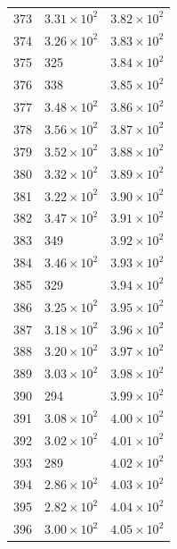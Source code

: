 \begin{table}[H]
\begin{tabular}{lll}
373 & $\displaystyle 3.31 \times 10^{2}$ & $\displaystyle 3.82 \times 10^{2}$ \\
374 & $\displaystyle 3.26 \times 10^{2}$ & $\displaystyle 3.83 \times 10^{2}$ \\
375 & 325 & $\displaystyle 3.84 \times 10^{2}$ \\
376 & 338 & $\displaystyle 3.85 \times 10^{2}$ \\
377 & $\displaystyle 3.48 \times 10^{2}$ & $\displaystyle 3.86 \times 10^{2}$ \\
378 & $\displaystyle 3.56 \times 10^{2}$ & $\displaystyle 3.87 \times 10^{2}$ \\
379 & $\displaystyle 3.52 \times 10^{2}$ & $\displaystyle 3.88 \times 10^{2}$ \\
380 & $\displaystyle 3.32 \times 10^{2}$ & $\displaystyle 3.89 \times 10^{2}$ \\
381 & $\displaystyle 3.22 \times 10^{2}$ & $\displaystyle 3.90 \times 10^{2}$ \\
382 & $\displaystyle 3.47 \times 10^{2}$ & $\displaystyle 3.91 \times 10^{2}$ \\
383 & 349 & $\displaystyle 3.92 \times 10^{2}$ \\
384 & $\displaystyle 3.46 \times 10^{2}$ & $\displaystyle 3.93 \times 10^{2}$ \\
385 & 329 & $\displaystyle 3.94 \times 10^{2}$ \\
386 & $\displaystyle 3.25 \times 10^{2}$ & $\displaystyle 3.95 \times 10^{2}$ \\
387 & $\displaystyle 3.18 \times 10^{2}$ & $\displaystyle 3.96 \times 10^{2}$ \\
388 & $\displaystyle 3.20 \times 10^{2}$ & $\displaystyle 3.97 \times 10^{2}$ \\
389 & $\displaystyle 3.03 \times 10^{2}$ & $\displaystyle 3.98 \times 10^{2}$ \\
390 & 294 & $\displaystyle 3.99 \times 10^{2}$ \\
391 & $\displaystyle 3.08 \times 10^{2}$ & $\displaystyle 4.00 \times 10^{2}$ \\
392 & $\displaystyle 3.02 \times 10^{2}$ & $\displaystyle 4.01 \times 10^{2}$ \\
393 & 289 & $\displaystyle 4.02 \times 10^{2}$ \\
394 & $\displaystyle 2.86 \times 10^{2}$ & $\displaystyle 4.03 \times 10^{2}$ \\
395 & $\displaystyle 2.82 \times 10^{2}$ & $\displaystyle 4.04 \times 10^{2}$ \\
396 & $\displaystyle 3.00 \times 10^{2}$ & $\displaystyle 4.05 \times 10^{2}$ \\

\end{tabular}
\end{table}

